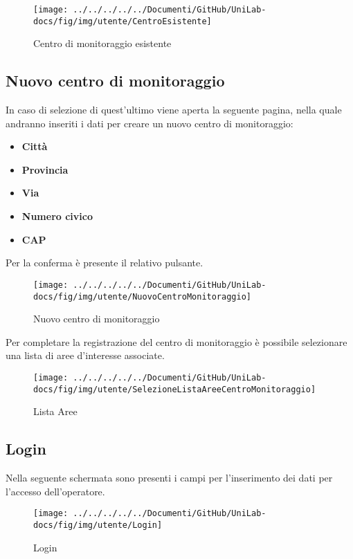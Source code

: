 \begin{figure}[h]
	\centering
	\texttt{[image: ../../../../../Documenti/GitHub/UniLab-docs/fig/img/utente/CentroEsistente]}
	\caption{Centro di monitoraggio esistente}
	\label{fig:centroesistente}
\end{figure}

\subsection{Nuovo centro di monitoraggio} \label{NuovoCentroDiMonitoraggio}
In caso di selezione di quest'ultimo viene aperta la seguente pagina, nella quale andranno inseriti i dati per creare un nuovo centro di monitoraggio:
\begin{itemize}
	\item \textbf{Città}
	\item \textbf{Provincia}
	\item \textbf{Via}
	\item \textbf{Numero civico}
	\item \textbf{CAP}
\end{itemize}

\pagebreak

Per la conferma è presente il relativo pulsante.
	
\begin{figure}[h]
	\centering
	\texttt{[image: ../../../../../Documenti/GitHub/UniLab-docs/fig/img/utente/NuovoCentroMonitoraggio]}
	\caption{Nuovo centro di monitoraggio}
	\label{fig:nuovocentromonitoraggio}
\end{figure}
	
Per completare la registrazione del centro di monitoraggio è possibile selezionare una lista di aree d'interesse associate.

\begin{figure}[h]
	\centering
	\texttt{[image: ../../../../../Documenti/GitHub/UniLab-docs/fig/img/utente/SelezioneListaAreeCentroMonitoraggio]}
	\caption{Lista Aree}
	\label{fig:selezionelistaareecentromonitoraggio}
\end{figure}

\pagebreak
\subsection{Login}
Nella seguente schermata sono presenti i campi per l'inserimento dei dati per l'accesso dell'operatore.
\begin{figure}[h]
	\centering
	\texttt{[image: ../../../../../Documenti/GitHub/UniLab-docs/fig/img/utente/Login]}
	\caption{Login}
	\label{fig:login}
\end{figure}



